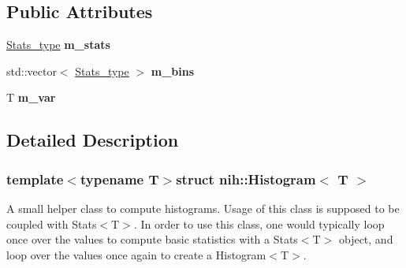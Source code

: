 \subsection*{\-Public \-Attributes}
\begin{DoxyCompactItemize}
\item 
\hypertarget{structnih_1_1_histogram_ae79b97be33196f5da19aa9c03f3449d2}{
\hyperlink{structnih_1_1_stats}{\-Stats\-\_\-type} {\bfseries m\-\_\-stats}}
\label{structnih_1_1_histogram_ae79b97be33196f5da19aa9c03f3449d2}

\item 
\hypertarget{structnih_1_1_histogram_aed852128b096e8b9fb2647e5ce55f25d}{
std\-::vector$<$ \hyperlink{structnih_1_1_stats}{\-Stats\-\_\-type} $>$ {\bfseries m\-\_\-bins}}
\label{structnih_1_1_histogram_aed852128b096e8b9fb2647e5ce55f25d}

\item 
\hypertarget{structnih_1_1_histogram_af87025d0e89655b81cc5b8bc3d164e5b}{
\-T {\bfseries m\-\_\-var}}
\label{structnih_1_1_histogram_af87025d0e89655b81cc5b8bc3d164e5b}

\end{DoxyCompactItemize}


\subsection{\-Detailed \-Description}
\subsubsection*{template$<$typename T$>$struct nih\-::\-Histogram$<$ T $>$}

\-A small helper class to compute histograms. \-Usage of this class is supposed to be coupled with {\ttfamily \-Stats$<$\-T$>$}. \-In order to use this class, one would typically loop once over the values to compute basic statistics with a {\ttfamily \-Stats$<$\-T$>$} object, and loop over the values once again to create a {\ttfamily \-Histogram$<$\-T$>$}. 

